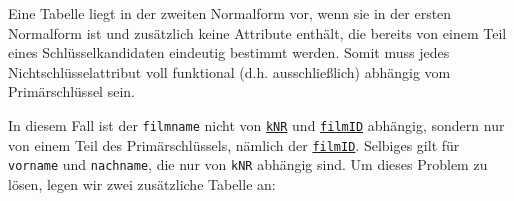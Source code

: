 \begin{tcolorbox}[title=Zweite Normalform]
	Eine Tabelle liegt in der zweiten Normalform vor, wenn sie in der ersten Normalform ist und zusätzlich keine Attribute enthält, die bereits von einem Teil eines Schlüsselkandidaten eindeutig bestimmt werden. Somit muss jedes Nichtschlüsselattribut voll funktional (d.h. ausschließlich) abhängig vom Primärschlüssel sein.
\end{tcolorbox}
In diesem Fall ist der \lstinline!filmname! nicht von \underline{\lstinline!kNR!} und \underline{\lstinline!filmID!} abhängig, sondern nur von einem Teil des Primärschlüssels, nämlich der \underline{\lstinline!filmID!}. Selbiges gilt für \lstinline!vorname! und \lstinline!nachname!, die nur von \lstinline!kNR! abhängig sind. Um dieses Problem zu lösen, legen wir zwei zusätzliche Tabelle an:

